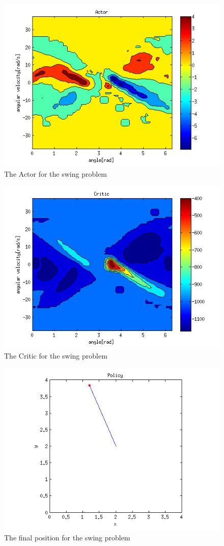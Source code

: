 \documentclass{article}
\begin{document}
\begin{figure}[h!]
    \centering
    \includegraphics[width=.7\textwidth]{actor_swing.png}
    \caption{The Actor for the swing problem}
    \label{fig:actor_swing}
\end{figure}

\begin{figure}[h!]
    \centering
    \includegraphics[width=.7\textwidth]{critic_swing.png}
    \caption{The Critic for the swing problem}
    \label{fig:critic_swing}
\end{figure}

\begin{figure}[h!]
    \centering
    \includegraphics[width=.7\textwidth]{result_swing.png}
    \caption{The final position for the swing problem}
    \label{fig:result_swing}
\end{figure}
\end{document}
